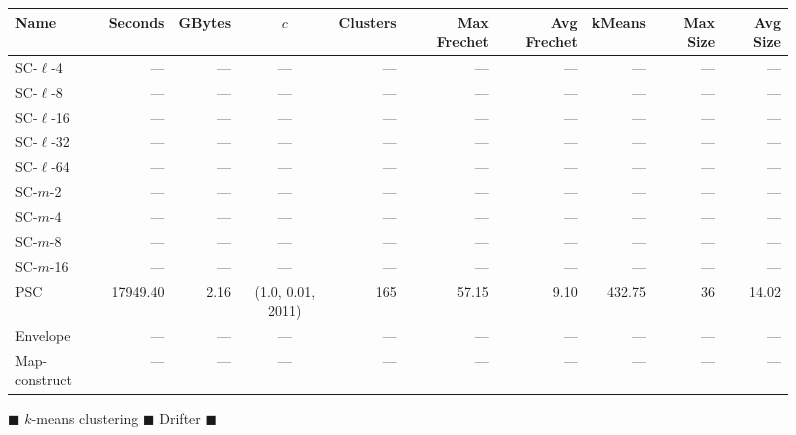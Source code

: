 \documentclass[11pt]{article}
\begin{document}
\clearpage
\newpage 
%
\clearpage
%
    \begin{figure} \begin{center}
        \begin{minipage}{\textwidth}
    {
    \begin{tabular}{@{}lrrcrrrrrr@{}}
        \toprule
        Name & Seconds & GBytes & $c$ & Clusters & Max Frechet & Avg Frechet & kMeans & Max Size & Avg Size\\
        \midrule
                SC-$\ell$-4 & --- & --- & --- & --- & --- & --- & --- & --- & ---\\
SC-$\ell$-8 & --- & --- & --- & --- & --- & --- & --- & --- & ---\\
SC-$\ell$-16 & --- & --- & --- & --- & --- & --- & --- & --- & ---\\
SC-$\ell$-32& --- & --- & --- & --- & --- & --- & --- & --- & ---\\
SC-$\ell$-64 & --- & --- & --- & --- & --- & --- & --- & --- & ---\\
SC-$m$-2 & --- & --- & --- & --- & --- & --- & --- & --- & ---\\
SC-$m$-4 & --- & --- & --- & --- & --- & --- & --- & --- & ---\\
SC-$m$-8 & --- & --- & --- & --- & --- & --- & --- & --- & ---\\
SC-$m$-16 & --- & --- & --- & --- & --- & --- & --- & --- & ---\\
        PSC & 17949.40 & 2.16 & (1.0, 0.01, 2011) & 165 & 57.15 & 9.10 & 432.75 & 36 & 14.02\\
        Envelope & --- & --- & --- & --- & --- & --- & --- & --- & ---\\
Map-construct & --- & --- & --- & --- & --- & --- & --- & --- & ---\\
        \bottomrule
    \end{tabular}}
\end{minipage}
        \caption{$\blacksquare$ $k$-means clustering $\blacksquare$ Drifter $\blacksquare$}
%
    \end{center} \end{figure}
\clearpage
\newpage 
%
\clearpage
%
\end{document}
